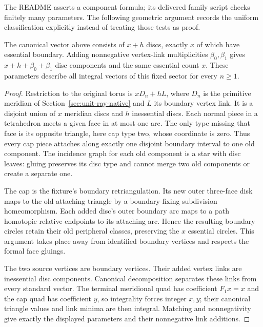 The README asserts a component formula; its delivered family script checks
finitely many parameters. The following geometric argument records the
uniform classification explicitly instead of treating those tests as proof.

\begin{proposition}
The canonical vector above consists of $x+h$ discs, exactly $x$ of which
have essential boundary. Adding nonnegative vertex-link multiplicities
$\beta_0,\beta_1$ gives $x+h+\beta_0+\beta_1$ disc components and the same
essential count $x$. These parameters describe all integral vectors of this
fixed sector for every $n\ge1$.
\end{proposition}
\begin{proof}
Restriction to the original torus is $xD_n+hL$, where $D_n$ is the primitive
meridian of Section~\ref{sec:unit-ray-native} and $L$ its boundary vertex
link. It is a disjoint union of $x$ meridian discs and $h$ inessential discs.
Each normal piece in a tetrahedron meets a given face in at most one arc.
The only type missing that face is its opposite triangle, here cap type two,
whose coordinate is zero. Thus every cap piece attaches along exactly one
disjoint boundary interval to one old component. The incidence graph for
each old component is a star with disc leaves: gluing preserves its disc
type and cannot merge two old components or create a separate one.

The cap is the fixture's boundary retriangulation. Its new outer three-face
disk maps to the old attaching triangle by a boundary-fixing subdivision
homeomorphism. Each added disc's outer boundary arc maps to a path homotopic
relative endpoints to its attaching arc. Hence the resulting boundary circles
retain their old peripheral classes, preserving the $x$ essential circles.
This argument takes place away from identified boundary vertices and respects
the formal face gluings.

The two source vertices are boundary vertices. Their added vertex links are
inessential disc components. Canonical decomposition separates these links
from every standard vector. The terminal meridional quad has coefficient
$F_1x=x$ and the cap quad has coefficient $y$, so integrality forces integer
$x,y$; their canonical triangle values and link minima are then integral.
Matching and nonnegativity give exactly the displayed parameters and their
nonnegative link additions.
\end{proof}

